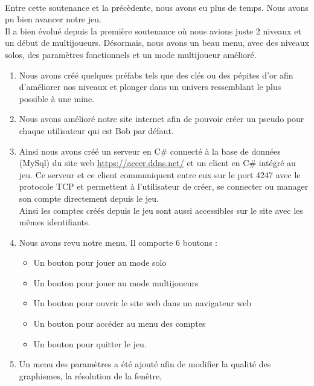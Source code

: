 \documentclass[titlepage, 13px, a4paper]{report}
\begin{document}
\paragraph{} \hspace{0pt} 
Entre cette soutenance et la précèdente, nous avons eu plus de temps. Nous avons pu bien avancer notre jeu. \\
Il a bien évolué depuis la première soutenance où nous avions juste 2 niveaux et un début de multijoueurs.
Désormais, nous avons un beau menu, avec des niveaux solos, des paramètres fonctionnels et un mode multijoueur amélioré.

{\begin{enumerate}
	\item Nous avons créé quelques préfabs tels que des clés ou des pépites d'or afin d’améliorer nos niveaux 
			et plonger dans un univers ressemblant le plus possible à une mine.	\\
	\item Nous avons amélioré notre site internet afin de pouvoir créer un pseudo pour chaque utilisateur qui est Bob par défaut.	\\
	\item Ainsi nous avons créé un serveur en C\# connecté à la base de données (MySql) du site web \url{https://accer.ddns.net/}
			et un client en C\# intégré au jeu. 
			Ce serveur et ce client communiquent entre eux sur le port 4247 avec le protocole TCP et permettent à l’utilisateur de créer, se connecter ou
			manager son compte directement depuis le jeu. \\
			Ainsi les comptes créés depuis le jeu sont aussi accessibles sur le site avec les mêmes identifiants. \\
	\item Nous avons revu notre menu. Il comporte 6 boutons :
		{\begin{itemize}
			\item	Un bouton pour jouer au mode solo
			\item	Un bouton pour jouer au mode multijoueurs
			\item	Un bouton pour ouvrir le site web dans un navigateur web
			\item	Un bouton pour accéder au menu des comptes
			\item	Un bouton pour quitter le jeu. \\
		\end{itemize}} 
	\item Un menu des paramètres a été ajouté afin de modifier la qualité des graphismes, la résolution de la fenêtre, 

\end{enumerate}}
\end{document}
